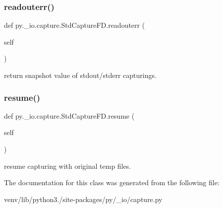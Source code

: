 \subsubsection{\texorpdfstring{readouterr()}{readouterr()}}
{\footnotesize\ttfamily def py.\+\_\+io.\+capture.\+Std\+Capture\+F\+D.\+readouterr (\begin{DoxyParamCaption}\item[{}]{self }\end{DoxyParamCaption})}

\begin{DoxyVerb}return snapshot value of stdout/stderr capturings. \end{DoxyVerb}
 \mbox{\label{classpy_1_1__io_1_1capture_1_1_std_capture_f_d_a7ad7f22f005425709dec0a189dbe471e}} 
\subsubsection{\texorpdfstring{resume()}{resume()}}
{\footnotesize\ttfamily def py.\+\_\+io.\+capture.\+Std\+Capture\+F\+D.\+resume (\begin{DoxyParamCaption}\item[{}]{self }\end{DoxyParamCaption})}

\begin{DoxyVerb}resume capturing with original temp files. \end{DoxyVerb}
 

The documentation for this class was generated from the following file\+:\begin{DoxyCompactItemize}
\item 
venv/lib/python3./site-\/packages/py/\+\_\+io/capture.\+py\end{DoxyCompactItemize}
